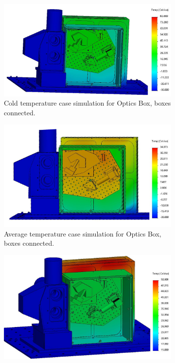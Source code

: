 \begin{figure}
    \centering
    \begin{subfigure}[h]{0.6\textwidth}
        \centering
        \includegraphics[width=\textwidth]{chap3_images/LIFE_V4_images/TA_Full_Model_Iter_1_FIXED.png}
        \caption{Cold temperature case simulation for Optics Box, boxes connected.}
        \label{fig:LIFE_V4_TA_Optics_1a}
    \end{subfigure}
    \begin{subfigure}[h]{0.6\textwidth}
        \centering
        \includegraphics[width=\textwidth]{chap3_images/LIFE_V4_images/TA_Full_Model_Iter_2_FIXED.png}
        \caption{Average temperature case simulation for Optics Box, boxes connected.}
        \label{fig:LIFE_V4_TA_Optics_1b}
    \end{subfigure}
    \begin{subfigure}[h]{0.6\textwidth}
        \centering
        \includegraphics[width=\textwidth]{chap3_images/LIFE_V4_images/TA_Full_Model_Iter_3_FIXED.png}

\end{subfigure}
\end{figure}
